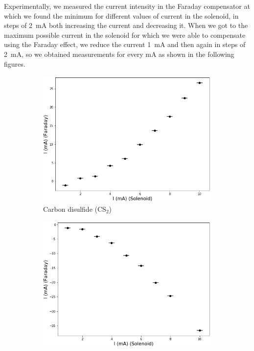\documentclass[11pt,a4paper]{article}
\begin{document}
Experimentally, we measured the current intensity in the Faraday compensator at which we found the minimum for different values of current in the solenoid, in steps of \SI{2}{\mA} both increasing the current and decreasing it. When we got to the maximum possible current in the solenoid for which we were able to compensate using the Faraday effect, we reduce the current \SI{1}{\mA} and then again in steps of \SI{2}{\mA}, so we obtained measurements for every \si{\mA} as shown in the following figures.

\begin{figure}[H]
\centering
\begin{subfigure}[b]{0.45\textwidth}
\includegraphics[width=\textwidth]{sample3}
\caption{Carbon disulfide (CS$_2$)}
\label{fig:CME_sample3}
\end{subfigure}
\begin{subfigure}[b]{0.45\textwidth}
\includegraphics[width=\textwidth]{sample2}

\end{subfigure}
\end{figure}
\end{document}
